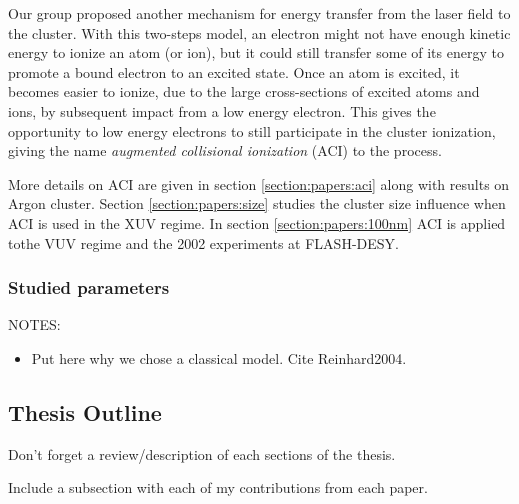 Our group proposed another mechanism for energy transfer from the laser field
to the cluster. With this two-steps model, an electron might not have enough
kinetic energy to ionize an atom (or ion), but it could still transfer some of
its energy to promote a bound electron to an excited state. Once an atom is
excited, it becomes easier to ionize, due to the large cross-sections of excited
atoms and ions, by subsequent impact from a low energy electron. This gives the
opportunity to low energy electrons to still participate in the cluster
ionization, giving the name \textit{augmented collisional ionization} (ACI) to
the process.


More details on ACI are given in section \ref{section:papers:aci} along with
results on Argon cluster. Section \ref{section:papers:size} studies the cluster
size influence when ACI is used in the XUV regime. In section
\ref{section:papers:100nm} ACI is applied tothe VUV regime and the
2002 experiments at FLASH-DESY.


\subsubsection{Studied parameters}
NOTES:
\begin{itemize}
\item Put here why we chose a classical model. Cite
Reinhard2004\cite{Reinhard2004}.
\end{itemize}






\subsection{Thesis Outline}
Don't forget a review/description of each sections of the thesis.

Include a subsection with each of my contributions from each paper.

